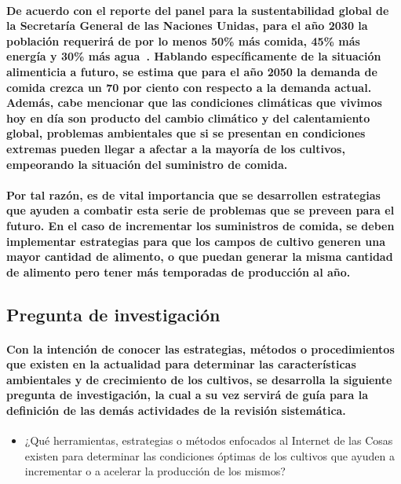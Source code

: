 \documentclass[10pt, twocolumn]{article}
\begin{document}
\paragraph{De acuerdo con el reporte del panel para la sustentabilidad global de la Secretaría General de las Naciones Unidas, para el año 2030 la población requerirá de por lo menos 50\% más comida, 45\% más energía y 30\% más agua~\cite{globalsustainabilityreport}. Hablando específicamente de la situación alimenticia a futuro, se estima que para el año 2050 la demanda de comida crezca un 70 por ciento con respecto a la demanda actual. \\ Además, cabe mencionar que las condiciones climáticas que vivimos hoy en día son producto del cambio climático y del calentamiento global, problemas ambientales que si se presentan en condiciones extremas pueden llegar a afectar a la mayoría de los cultivos, empeorando la situación del suministro de comida.}

\paragraph{Por tal razón, es de vital importancia que se desarrollen estrategias que ayuden a combatir esta serie de problemas que se preveen para el futuro. En el caso de incrementar los suministros de comida, se deben implementar estrategias para que los campos de cultivo generen una mayor cantidad de alimento, o que puedan generar la misma cantidad de alimento pero tener más temporadas de producción al año.}

\subsection{Pregunta de investigación}
\paragraph{Con la intención de conocer las estrategias, métodos o procedimientos que existen en la actualidad para determinar las características ambientales y de crecimiento de los cultivos, se desarrolla la siguiente pregunta de investigación, la cual a su vez servirá de guía para la definición de las demás actividades de la revisión sistemática.}
\begin{itemize}
	\item{¿Qué herramientas, estrategias o métodos enfocados al Internet de las Cosas existen para determinar las condiciones óptimas de los cultivos que ayuden a incrementar o a acelerar la producción de los mismos?}
\end{itemize}
\end{document}

